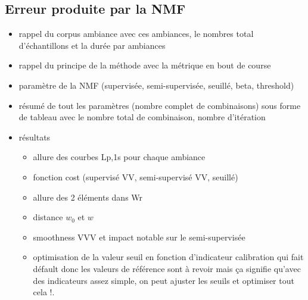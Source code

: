 \subsection{Erreur produite par la NMF}


\label{chap:grafic}
\begin{itemize}
\item rappel du corpus ambiance avec ces ambiances, le nombres total d'échantillons et la durée par ambiances
\item rappel du principe de la méthode avec la métrique en bout de course
\item paramètre de la NMF (supervisée, semi-supervisée, seuillé, beta, threshold)
\item résumé de tout les paramètres (nombre complet de combinaisons) sous forme de tableau avec le nombre total de combinaison, nombre d'itération
\item résultats
\begin{itemize}


\item allure des courbes Lp,1s pour chaque ambiance
\item fonction cost (supervisé VV, semi-supervisé VV, seuillé)
\item allure des 2 éléments dans Wr
\item distance $w_0$ et $w$
\item smoothness VVV et impact notable sur le semi-supervisée
\item optimisation de la valeur seuil en fonction d'indicateur
calibration qui fait défault donc les valeurs de référence sont à revoir mais ça signifie qu'avec des indicateurs assez simple, on peut ajuster les seuils et optimiser tout cela !.
\end{itemize}
\end{itemize}


